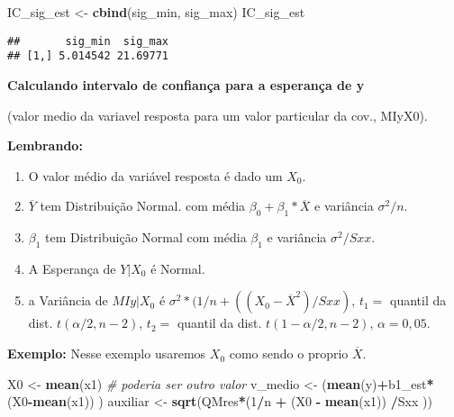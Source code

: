 \documentclass[
]{article}
\newenvironment{Shaded}{\begin{snugshade}}{\end{snugshade}}
\newcommand{\CommentTok}[1]{\textcolor[rgb]{0.56,0.35,0.01}{\textit{#1}}}
\newcommand{\DecValTok}[1]{\textcolor[rgb]{0.00,0.00,0.81}{#1}}
\newcommand{\KeywordTok}[1]{\textcolor[rgb]{0.13,0.29,0.53}{\textbf{#1}}}
\newcommand{\NormalTok}[1]{#1}
\newcommand{\OperatorTok}[1]{\textcolor[rgb]{0.81,0.36,0.00}{\textbf{#1}}}
\newcommand{\StringTok}[1]{\textcolor[rgb]{0.31,0.60,0.02}{#1}}
\providecommand{\tightlist}{%
  \setlength{\itemsep}{0pt}\setlength{\parskip}{0pt}}
\begin{document}
\begin{Shaded}
\begin{Highlighting}[]
\NormalTok{IC_sig_est <-}\StringTok{ }\KeywordTok{cbind}\NormalTok{(sig_min, sig_max)}
\NormalTok{IC_sig_est}
\end{Highlighting}
\end{Shaded}

\begin{verbatim}
##       sig_min  sig_max
## [1,] 5.014542 21.69771
\end{verbatim}

\textbf{Calculando intervalo de confiança para a esperança de y}

(valor medio da variavel resposta para um valor particular da cov.,
MIy\textbar X0).

\textbf{Lembrando:}

\begin{enumerate}
\def\labelenumi{\arabic{enumi}.}
\tightlist
\item
  O valor médio da variável resposta é dado um \(X_0\).
\item
  \(\overline{Y}\) tem Distribuição Normal. com média
  \(\beta_0+\beta_1*\overline{X}\) e variância \(\sigma^2/n\).
\item
  \(\beta_1\) tem Distribuição Normal com média \(\beta_1\) e variância
  \(\sigma^2/Sxx\).
\item
  A Esperança de \(Y|X_0\) é Normal.
\item
  a Variância de \(MIy|X_0\) é
  \(\sigma^2*(1/n + ((X_0-\overline{X}^2)/Sxx)\), \(t_1 =\) quantil da
  dist. \(t(\alpha/2,n-2)\), \(t_2 =\) quantil da dist.
  \(t(1-\alpha/2,n-2)\), \(\alpha = 0,05\).
\end{enumerate}

\textbf{Exemplo:} Nesse exemplo usaremos \(X_0\) como sendo o proprio
\(\overline{X}\).

\begin{Shaded}
\begin{Highlighting}[]
\NormalTok{X0 <-}\StringTok{ }\KeywordTok{mean}\NormalTok{(x1) }\CommentTok{# poderia ser outro valor}
\NormalTok{v_medio <-}\StringTok{ }\NormalTok{(}\KeywordTok{mean}\NormalTok{(y)}\OperatorTok{+}\NormalTok{b1_est}\OperatorTok{*}\StringTok{ }\NormalTok{(X0}\OperatorTok{-}\KeywordTok{mean}\NormalTok{(x1)) )}
\NormalTok{auxiliar <-}\StringTok{ }\KeywordTok{sqrt}\NormalTok{(QMres}\OperatorTok{*}\NormalTok{(}\DecValTok{1}\OperatorTok{/}\NormalTok{n }\OperatorTok{+}\StringTok{ }\NormalTok{(X0 }\OperatorTok{-}\StringTok{ }\KeywordTok{mean}\NormalTok{(x1)) }\OperatorTok{/}\NormalTok{Sxx ))}
\end{Highlighting}
\end{Shaded}
\end{document}
